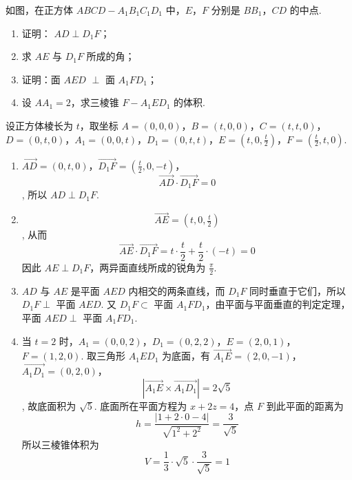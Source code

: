 \begin{problem}
如图，在正方体 \(ABCD - A_{1}B_{1}C_{1}D_{1}\) 中，\(E\)，\(F\) 分别是 \(BB_{1}\)，\(CD\) 的中点.
\begin{enumerate}
\item 证明： \(AD \perp D_{1}F\)；
\item 求 \(AE\) 与 \(D_{1}F\) 所成的角；
\item 证明：面 \(AED\) \(\perp\) 面 \(A_{1}FD_{1}\)；
\item 设 \(AA_{1} = 2\)，求三棱锥 \(F - A_{1}ED_{1}\) 的体积.
\end{enumerate}

\end{problem}

\begin{solution}
设正方体棱长为 \(t\)，取坐标 \(A=(0,0,0)\)，\(B=(t,0,0)\)，\(C=(t,t,0)\)，\(D=(0,t,0)\)，\(A_1=(0,0,t)\)，\(D_1=(0,t,t)\)，\(E=(t,0,\tfrac t2)\)，\(F=(\tfrac t2,t,0)\).
\begin{enumerate}
\item
\(\overrightarrow{AD}=(0,t,0)\)，\(\overrightarrow{D_1F}=(\tfrac t2,0,-t)\)，
\[
\overrightarrow{AD}\cdot\overrightarrow{D_1F}=0
\],
所以 \(AD\perp D_1F\).

\item
\[
\overrightarrow{AE}=(t,0,\tfrac t2)
\],
从而
\[
\overrightarrow{AE}\cdot\overrightarrow{D_1F}
=t\cdot\frac t2+\frac t2\cdot(-t)=0
\]
因此 \(AE\perp D_1F\)，两异面直线所成的锐角为 \(\frac\pi2\).

\item \(AD\) 与 \(AE\) 是平面 \(AED\) 内相交的两条直线，而 \(D_1F\) 同时垂直于它们，所以 \(D_1F\perp\) 平面 \(AED\). 又 \(D_1F\subset\) 平面 \(A_1FD_1\)，由平面与平面垂直的判定定理，平面 \(AED\perp\) 平面 \(A_1FD_1\).

\item 当 \(t=2\) 时，\(A_1=(0,0,2)\)，\(D_1=(0,2,2)\)，\(E=(2,0,1)\)，\(F=(1,2,0)\).
取三角形 \(A_1ED_1\) 为底面，有
\(\overrightarrow{A_1E}=(2,0,-1)\)，\(\overrightarrow{A_1D_1}=(0,2,0)\)，
\[
\left|\overrightarrow{A_1E}\times\overrightarrow{A_1D_1}\right|
=2\sqrt5
\],
故底面积为 \(\sqrt5\). 底面所在平面方程为 \(x+2z=4\)，点 \(F\) 到此平面的距离为
\[
h=\frac{|1+2\cdot0-4|}{\sqrt{1^2+2^2}}=\frac3{\sqrt5}
\]
所以三棱锥体积为
\[
V=\frac13\cdot\sqrt5\cdot\frac3{\sqrt5}=1
\]
\end{enumerate}
\end{solution}

